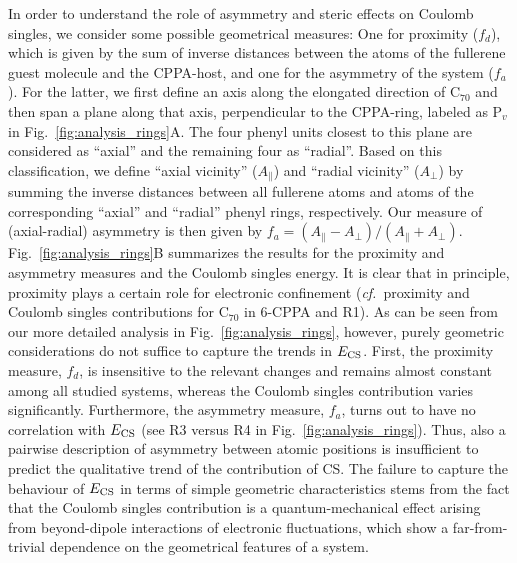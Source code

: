 \documentclass[aps,prl,groupaddress, twocolumn]{revtex4-1}  %
\begin{document}
In order to understand the role of asymmetry and steric effects on Coulomb singles, we consider some possible geometrical measures:
One for proximity ($f_d$), which is given by the sum of inverse distances between the atoms of the fullerene guest molecule and the CPPA-host, and one for the asymmetry of the system ($f_a$).
For the latter, we first define an axis along the elongated direction of C$_{70}$ and then span a plane along that axis, perpendicular to the CPPA-ring, labeled as P$_v$ in Fig.~\ref{fig:analysis_rings}A.
The four phenyl units closest to this plane are considered as ``axial'' and the remaining four as ``radial''.
Based on this classification, we define ``axial vicinity'' ($A_{\parallel}$) and ``radial vicinity'' ($A_{\perp}$) by summing the inverse distances between all fullerene atoms and atoms of the corresponding ``axial'' and ``radial'' phenyl rings, respectively.
Our measure of (axial-radial) asymmetry is then given by $f_a = (A_{\parallel} - A_{\perp})/(A_{\parallel} + A_{\perp})$. Fig.~\ref{fig:analysis_rings}B summarizes the results for the proximity and asymmetry measures and the Coulomb singles energy.
It is clear that in principle, proximity plays a certain role for electronic confinement (\textit{cf.}\ proximity and Coulomb singles contributions for C$_{70}$ in 6-CPPA and R1). As can be seen from our more detailed analysis in Fig.~\ref{fig:analysis_rings}, however, purely geometric considerations do not suffice to capture the trends in $E_{\rm CS}$. First, the proximity measure, $f_d$, is insensitive to the relevant changes and remains almost constant among all studied systems, whereas the Coulomb singles contribution varies significantly.
Furthermore, the asymmetry measure, $f_a$, turns out to have no correlation with $E_{\rm CS}$ (see R3 versus R4 in Fig.~\ref{fig:analysis_rings}).
Thus, also a pairwise description of asymmetry between atomic positions is insufficient to predict the qualitative trend of the contribution of CS\@.
The failure to capture the behaviour of $E_{\rm CS}$ in terms of simple geometric characteristics stems from the fact that the Coulomb singles contribution is a quantum-mechanical effect arising from beyond-dipole interactions of electronic fluctuations, which show a far-from-trivial dependence on the geometrical features of a system.
\end{document}
